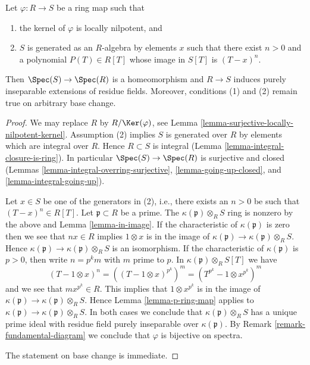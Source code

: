 \begin{lemma}
\label{lemma-universally-bijective}
Let $\varphi : R \to S$ be a ring map such that
\begin{enumerate}
\item the kernel of $\varphi$ is locally nilpotent, and
\item $S$ is generated as an $R$-algebra by elements $x$
such that there exist $n > 0$ and a polynomial $P(T) \in R[T]$
whose image in $S[T]$ is $(T - x)^n$.
\end{enumerate}
Then $\Spec(S) \to \Spec(R)$ is a homeomorphism and $R \to S$
induces purely inseparable extensions of residue fields.
Moreover, conditions (1) and (2) remain true on arbitrary base change.
\end{lemma}

\begin{proof}
We may replace $R$ by $R/\Ker(\varphi)$, see
Lemma \ref{lemma-surjective-locally-nilpotent-kernel}.
Assumption (2) implies $S$ is generated over $R$ by
elements which are integral over $R$.
Hence $R \subset S$ is integral
(Lemma \ref{lemma-integral-closure-is-ring}).
In particular $\Spec(S) \to \Spec(R)$ is surjective and closed
(Lemmas \ref{lemma-integral-overring-surjective},
\ref{lemma-going-up-closed}, and
\ref{lemma-integral-going-up}).

\medskip\noindent
Let $x \in S$ be one of the generators in (2), i.e., there exists an
$n > 0$ be such that $(T - x)^n \in R[T]$.
Let $\mathfrak p \subset R$ be a prime.
The $\kappa(\mathfrak p) \otimes_R S$ ring is nonzero by
the above and Lemma \ref{lemma-in-image}.
If the characteristic of $\kappa(\mathfrak p)$ is zero
then we see that $nx \in R$ implies $1 \otimes x$ is in the image
of $\kappa(\mathfrak p) \to \kappa(\mathfrak p) \otimes_R S$.
Hence $\kappa(\mathfrak p) \to \kappa(\mathfrak p) \otimes_R S$
is an isomorphism.
If the characteristic of $\kappa(\mathfrak p)$ is $p > 0$,
then write $n = p^k m$ with $m$ prime to $p$.
In $\kappa(\mathfrak p) \otimes_R S[T]$ we have
$$
(T - 1 \otimes x)^n = ((T - 1 \otimes x)^{p^k})^m =
(T^{p^k} - 1 \otimes x^{p^k})^m
$$
and we see that $mx^{p^k} \in R$. This implies that
$1 \otimes x^{p^k}$ is in the image of
$\kappa(\mathfrak p) \to \kappa(\mathfrak p) \otimes_R S$.
Hence Lemma \ref{lemma-p-ring-map} applies to
$\kappa(\mathfrak p) \to \kappa(\mathfrak p) \otimes_R S$.
In both cases we conclude that $\kappa(\mathfrak p) \otimes_R S$
has a unique prime ideal with residue field purely inseparable
over $\kappa(\mathfrak p)$. By Remark \ref{remark-fundamental-diagram}
we conclude that $\varphi$ is bijective on spectra.

\medskip\noindent
The statement on base change is immediate.
\end{proof}